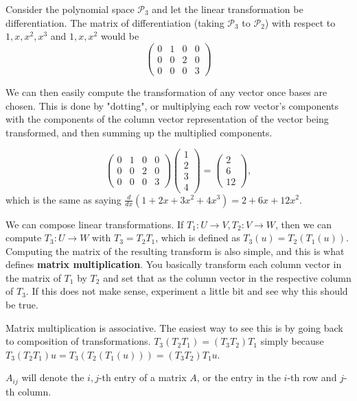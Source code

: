 \begin{ex}
Consider the polynomial space $\mathcal{P}_3$ and let the linear
transformation be differentiation. The matrix of differentiation (taking
$\mathcal{P}_3$ to $\mathcal{P}_2$) with respect to $1, x, x^2, x^3$ and
$1, x, x^2$ would be
\[ \begin{pmatrix}
0 & 1 & 0 & 0 \\
0 & 0 & 2 & 0 \\
0 & 0 & 0 & 3
\end{pmatrix} \]
\end{ex}

We can then easily compute the transformation of any vector once bases
are chosen. This is done by "dotting", or multiplying each row vector's
components with the components of the column vector representation of
the vector being transformed, and then summing up the multiplied
components.

\begin{ex}
\[ \begin{pmatrix}
0 & 1 & 0 & 0 \\
0 & 0 & 2 & 0 \\
0 & 0 & 0 & 3
\end{pmatrix} \begin{pmatrix}
1 \\ 2 \\ 3 \\ 4
\end{pmatrix} = \begin{pmatrix}
2 \\ 6 \\ 12
\end{pmatrix}, \]
which is the same as saying $\frac{d}{dx}(1 + 2x + 3x^2 + 4x^3) = 2 + 6x
+ 12x^2$.
\end{ex}

\begin{rem}
We can compose linear transformations. If $T_1 : U \rightarrow V, T_2 :
V \rightarrow W$, then we can compute $T_3 : U \rightarrow W$ with $T_3
= T_2 T_1$, which is defined as $T_3(u) = T_2(T_1(u))$. Computing the
matrix of the resulting transform is also simple, and this is what
defines \textbf{matrix multiplication}. You basically transform each
column vector in the matrix of $T_1$ by $T_2$ and set that as the column
vector in the respective column of $T_3$. If this does not make sense,
experiment a little bit and see why this should be true.
\end{rem}

\begin{rem}
Matrix multiplication is associative. The easiest way to see this is by
going back to composition of transformations. $T_3 (T_2 T_1) = (T_3 T_2)
T_1$ simply because $T_3 (T_2 T_1) u = T_3(T_2(T_1(u))) = (T_3 T_2) T_1
u$.
\end{rem}

\begin{rem}
$A_{ij}$ will denote the $i,j$-th entry of a matrix $A$, or the entry in
the $i$-th row and $j$-th column.
\end{rem}
